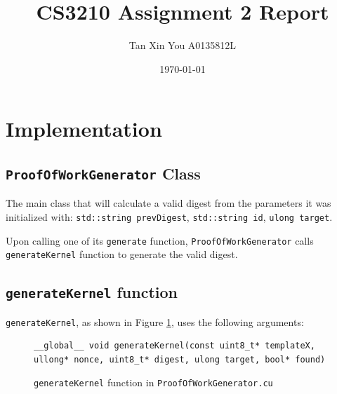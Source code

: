 \documentclass[a4paper]{article}
\title{CS3210 Assignment 2 Report}
\author{Tan Xin You A0135812L}
\date{\today}
\begin{document}
\maketitle

\section{Implementation}
\label{sec:introduction}
\subsection{\texttt{ProofOfWorkGenerator} Class}
The main class that will calculate a valid digest from the parameters it was initialized with: \texttt{std::string prevDigest}, \texttt{std::string id}, \texttt{ulong target}.

Upon calling one of its \texttt{generate} function, \texttt{ProofOfWorkGenerator} calls \texttt{generateKernel} function to generate the valid digest. 

\subsection{\texttt{generateKernel} function}
\texttt{generateKernel}, as shown in Figure \ref{fig:generate-kernel}, uses the following arguments:

\begin{figure}
\begin{lstlisting}
__global__ void generateKernel(const uint8_t* templateX, ullong* nonce, uint8_t* digest, ulong target, bool* found)
\end{lstlisting}
\caption{\label{fig:generate-kernel} \texttt{generateKernel} function in \texttt{ProofOfWorkGenerator.cu}}
\end{figure}
\end{document}
